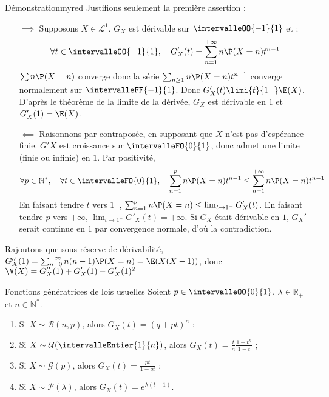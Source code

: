     \begin{demo}{Démonstration}{myred}
        Justifions seulement la première assertion :
        \begin{itemize}
            \item[$\implies$] Supposons $X \in \mathcal{L}^1$. $G_X$ est dérivable sur $\intervalleOO{-1}{1}$ et :
            \[ \forall t \in \intervalleOO{-1}{1}, \quad G_X'(t) = \sum_{n = 1}^{+\infty} n \P(X = n) t^{n-1} \]    
            $\sum n \P(X = n)$ converge donc la série $\sum_{n \geq 1} n \P(X = n) t^{n-1}$ converge normalement sur $\intervalleFF{-1}{1}$. Donc $G_X'(t) \limi{t}{1^-} \E(X)$. D’après le théorème de la limite de la dérivée, $G_X$ est dérivable en $1$ et $G'_X(1) = \E(X)$. 
            \item[$\impliedby$] Raisonnons par contraposée, en supposant que $X$ n’est pas d’espérance finie. $G'X$ est croissance sur $\intervalleFO{0}{1}$, donc admet une limite (finie ou infinie) en $1$. Par positivité, 
            \[ \forall p \in \mathbb{N}^*, \quad \forall t \in \intervalleFO{0}{1}, \quad \sum_{n = 1}^p n \P(X = n) t^{n-1} \leq \sum_{n=1}^{+\infty} n \P(X = n) t^{n-1} \]  
            En faisant tendre $t$ vers $1^-$, $\sum_{n=1}^{p} n\P(X = n) \leq \lim_{t \to 1^-} G_X'(t)$. En faisant tendre $p$ vers $+\infty$, $\lim_{t \to 1^-} G'_X(t) = + \infty$. Si $G_X$ était dérivable en $1$, $G_X'$ serait continue en $1$ par convergence normale, d’où la contradiction.
        \end{itemize}
        Rajoutons que sous réserve de dérivabilité, $G''_X(1) = \sum_{n=0}^{+\infty} n(n-1)\P(X=n) = \E(X(X-1))$, donc $\V(X) = G''_X(1) + G'_X(1) - G_X'(1)^2$
    \end{demo}

    \begin{prop}{Fonctions génératrices de lois usuelles}{}
        Soient $p \in \intervalleOO{0}{1}$, $\lambda \in \mathbb{R}_+$ et $n \in \mathbb{N}^*$.
        \begin{enumerate}
            \item Si $X \sim \mathcal{B}(n,p)$, alors $G_X(t) = (q + pt)^n$ ;
            \item Si $X \sim \mathcal{U}(\intervalleEntier{1}{n})$, alors $G_X(t) = \frac{t}{n} \frac{1 - t^n}{1 - t}$ ;
            \item Si $X \sim \mathcal{G}(p)$, alors $G_X(t) = \frac{pt}{1 - qt}$ ;
            \item Si $X \sim \mathcal{P}(\lambda)$, alors $G_X(t) = e^{\lambda(t-1)}$.
        \end{enumerate}
    \end{prop}

